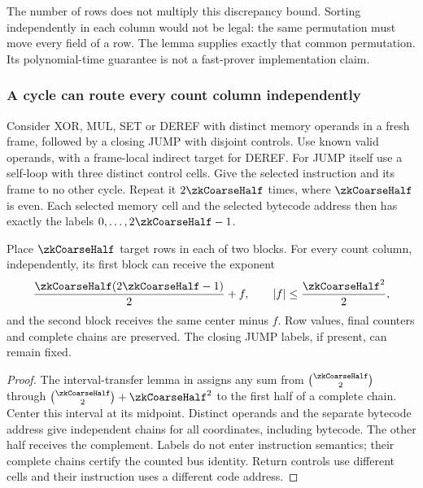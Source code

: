 The number of rows does not multiply this discrepancy bound. Sorting independently in each column would not be legal: the same permutation must move every field of a row. The lemma supplies exactly that common permutation. Its polynomial-time guarantee is not a fast-prover implementation claim.

\subsubsection{A cycle can route every count column independently}

Consider XOR, MUL, SET or DEREF with distinct memory operands in a fresh frame, followed by a closing JUMP with disjoint controls. Use known valid operands, with a frame-local indirect target for DEREF. For JUMP itself use a self-loop with three distinct control cells. Give the selected instruction and its frame to no other cycle. Repeat it $2\zkCoarseHalf$ times, where $\zkCoarseHalf$ is even. Each selected memory cell and the selected bytecode address then has exactly the labels $0,\ldots,2\zkCoarseHalf-1$.

\begin{lemma}\label{lem:zk-coarse-cycle-transfer}
Place $\zkCoarseHalf$ target rows in each of two blocks. For every count column, independently, its first block can receive the exponent
\[
 \frac{\zkCoarseHalf(2\zkCoarseHalf-1)}2+f,
 \qquad |f|\le\frac{\zkCoarseHalf^2}2,
\]
and the second block receives the same center minus $f$. Row values, final counters and complete chains are preserved. The closing JUMP labels, if present, can remain fixed.
\end{lemma}
\begin{proof}
The interval-transfer lemma in  assigns any sum from $\binom{\zkCoarseHalf}{2}$ through $\binom{\zkCoarseHalf}{2}+\zkCoarseHalf^2$ to the first half of a complete chain. Center this interval at its midpoint. Distinct operands and the separate bytecode address give independent chains for all coordinates, including bytecode. The other half receives the complement. Labels do not enter instruction semantics; their complete chains certify the counted bus identity. Return controls use different cells and their instruction uses a different code address.
\end{proof}


